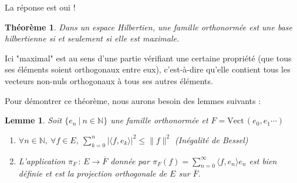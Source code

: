 \documentclass[]{article}
\newtheorem{mythm}{Théorème}
\newtheorem{mylemma}{Lemme}
\theoremstyle{remark}
\theoremstyle{definition}
\newcommand{\funcshort}[3]{
	#1 \, : \, #2 \longrightarrow #3
}
\newcommand{\vect}{\text{Vect}}
\newcommand{\DS}{\displaystyle}
\begin{document}
	La réponse est oui !
	
	\begin{mythm}
		Dans un espace Hilbertien, une famille orthonormée est une base hilbertienne si et seulement si elle est maximale.
	\end{mythm}
	
	Ici "maximal" est au sens d'une partie vérifiant une certaine propriété (que tous ses éléments soient orthogonaux entre eux), c'est-à-dire qu'elle contient tous les vecteurs non-nuls orthogonaux à tous ses autres éléments.
	
	Pour démontrer ce théorème, nous aurons besoin des lemmes suivants :
	
	\begin{mylemma}
		Soit $\{e_n ~ | ~ n \in \mathbb{N}\}$ une famille orthonormée et $F = \vect \, (e_0, e_1 \cdots)$
		\begin{enumerate}
			\item $\forall n \in \mathbb{N}, ~ \forall f \in E, ~ \DS \sum_{k = 0}^{n} |\langle f, e_k \rangle|^2 \leqslant \|f\|^2$ (Inégalité de Bessel)
			\item L'application $\funcshort{\pi_F}{E}{\overline{F}}$ donnée par $\DS \pi_F(f) = \sum_{n = 0}^\infty \langle f, e_n \rangle e_n$ est bien définie et est la projection orthogonale de $E$ sur $\overline{F}$.
		\end{enumerate}
	\end{mylemma}
	
\end{document}
